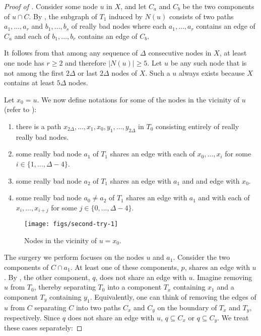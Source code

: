\documentclass{patmorin}
\begin{document}
\begin{proof}[Proof of ]
Consider some node $u$ in $X$, and let $C_a$ and $C_b$ be the
two components of $u\cap C$. By , the subgraph of $T_1$ induced by $N(u)$ consists
of two paths $a_1,\ldots,a_r$ and $b_1,\ldots,b_s$ of really bad nodes
where each $a_1,\ldots,a_r$ contains an edge of $C_a$ and each of
$b_1,\ldots,b_r$ contains an edge of $C_b$.

It follows from  that among any sequence of $\Delta$
consecutive nodes in $X$, at least one node has $r\ge 2$ and therefore $|N(u)|\ge 5$.  Let $u$ be any such node that is not among the first $2\Delta$
or last $2\Delta$ nodes of $X$.  Such a $u$ always exists because $X$
contains at least $5\Delta$ nodes.

Let $x_0=u$. We now define notations for some of the nodes in the vicinity of $u$ (refer to ):
\begin{enumerate}
  \item there is a path
    $x_{2\Delta},\ldots,x_1,x_0,y_1,\ldots,y_{2\Delta}$
    in $T_0$ consisting entirely of really really bad nodes.
  \item some really bad node $a_1$ of $T_1$ shares an edge with each of
    $x_0,\ldots,x_i$ for some $i\in\{1,\ldots,\Delta-4\}$.
  \item some really bad node $a_2$ of $T_1$ shares an edge with $a_1$ and
    and edge with $x_0$.
  \item some really bad node $a_0\neq a_2$ of $T_1$ shares an edge with $a_1$ and
    with each of $x_i,\ldots,x_{i+j}$ for some $j\in\{0,\ldots,\Delta-4\}$.
\end{enumerate}

\begin{figure}
   \begin{center}\texttt{[image: figs/second-try-1]}\end{center}
   \caption{Nodes in the vicinity of $u=x_0$.}
\end{figure}

The surgery we perform focuses on the nodes $u$ and $a_1$.  Consider
the two components of $C\cap a_1$. At least one of these components, $p$, shares
an edge with $u$.  By , the other component,
$q$, does not share an edge with $u$.  Imagine removing $u$ from $T_0$,
thereby separating $T_0$ into a component $T_x$ containing $x_1$ and a
component $T_y$ containing $y_1$.  Equivalently, one can think of removing
the edges of $u$ from $C$ separating $C$ into two paths $C_x$ and $C_y$
on the boundary of $T_x$ and $T_y$, respectively.  Since $q$ does not share an edge with $u$, $q\subseteq C_x$ or $q\subseteq C_y$.  We treat these cases separately:


\end{proof}
\end{document}
